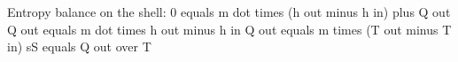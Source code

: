 Entropy balance on the shell:
0 equals m dot times (h out minus h in) plus Q out
Q out equals m dot times h out minus h in
Q out equals m times (T out minus T in)
sS equals Q out over T